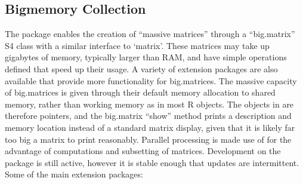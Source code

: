 \subsection{Bigmemory Collection}\label{subsec:bigmemory-collection}

The  package enables the creation of ``massive matrices''
through a ``big.matrix'' S4 class with a similar interface to
`matrix'\cite{kane13:bigmemory}. These matrices may take up gigabytes of
memory, typically larger than RAM, and have simple operations defined
that speed up their usage. A variety of extension packages are also
available that provide more functionality for big.matrices. The massive
capacity of big.matrices is given through their default memory
allocation to shared memory, rather than working memory as in most R
objects. The objects in \R are therefore pointers, and the big.matrix
``show'' method prints a description and memory location instead of a
standard matrix display, given that it is likely far too big a matrix to
print reasonably. Parallel processing is made use of for the advantage
of computations and subsetting of matrices. Development on the package
is still active, however it is stable enough that updates are
intermittent. Some of the main extension packages:

